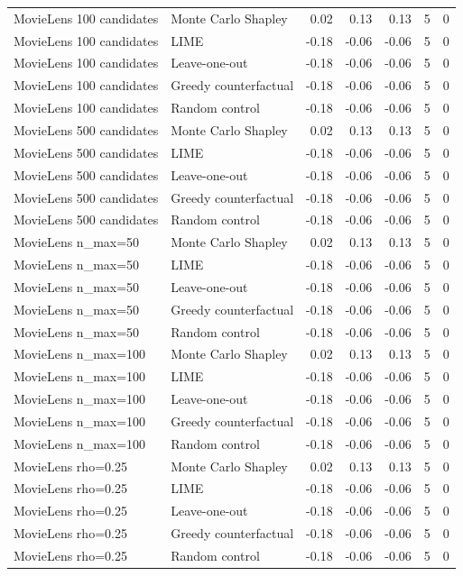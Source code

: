\begin{table}[t]
{\begin{tabular}{llrrrrr}
MovieLens 100 candidates & Monte Carlo Shapley & 0.02 & 0.13 & 0.13 & 5 & 0 \\
MovieLens 100 candidates & LIME & -0.18 & -0.06 & -0.06 & 5 & 0 \\
MovieLens 100 candidates & Leave-one-out & -0.18 & -0.06 & -0.06 & 5 & 0 \\
MovieLens 100 candidates & Greedy counterfactual & -0.18 & -0.06 & -0.06 & 5 & 0 \\
MovieLens 100 candidates & Random control & -0.18 & -0.06 & -0.06 & 5 & 0 \\
MovieLens 500 candidates & Monte Carlo Shapley & 0.02 & 0.13 & 0.13 & 5 & 0 \\
MovieLens 500 candidates & LIME & -0.18 & -0.06 & -0.06 & 5 & 0 \\
MovieLens 500 candidates & Leave-one-out & -0.18 & -0.06 & -0.06 & 5 & 0 \\
MovieLens 500 candidates & Greedy counterfactual & -0.18 & -0.06 & -0.06 & 5 & 0 \\
MovieLens 500 candidates & Random control & -0.18 & -0.06 & -0.06 & 5 & 0 \\
MovieLens n\_max=50 & Monte Carlo Shapley & 0.02 & 0.13 & 0.13 & 5 & 0 \\
MovieLens n\_max=50 & LIME & -0.18 & -0.06 & -0.06 & 5 & 0 \\
MovieLens n\_max=50 & Leave-one-out & -0.18 & -0.06 & -0.06 & 5 & 0 \\
MovieLens n\_max=50 & Greedy counterfactual & -0.18 & -0.06 & -0.06 & 5 & 0 \\
MovieLens n\_max=50 & Random control & -0.18 & -0.06 & -0.06 & 5 & 0 \\
MovieLens n\_max=100 & Monte Carlo Shapley & 0.02 & 0.13 & 0.13 & 5 & 0 \\
MovieLens n\_max=100 & LIME & -0.18 & -0.06 & -0.06 & 5 & 0 \\
MovieLens n\_max=100 & Leave-one-out & -0.18 & -0.06 & -0.06 & 5 & 0 \\
MovieLens n\_max=100 & Greedy counterfactual & -0.18 & -0.06 & -0.06 & 5 & 0 \\
MovieLens n\_max=100 & Random control & -0.18 & -0.06 & -0.06 & 5 & 0 \\
MovieLens rho=0.25 & Monte Carlo Shapley & 0.02 & 0.13 & 0.13 & 5 & 0 \\
MovieLens rho=0.25 & LIME & -0.18 & -0.06 & -0.06 & 5 & 0 \\
MovieLens rho=0.25 & Leave-one-out & -0.18 & -0.06 & -0.06 & 5 & 0 \\
MovieLens rho=0.25 & Greedy counterfactual & -0.18 & -0.06 & -0.06 & 5 & 0 \\
MovieLens rho=0.25 & Random control & -0.18 & -0.06 & -0.06 & 5 & 0 \\
\bottomrule
\end{tabular}
}
\end{table}

